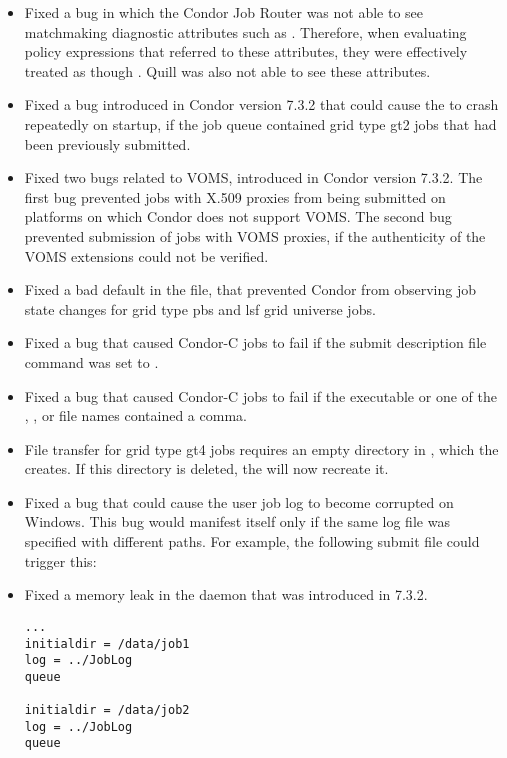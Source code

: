 \begin{itemize}
\item Fixed a bug in which the Condor Job Router was not able
to see matchmaking diagnostic attributes such as .
Therefore, when evaluating policy
expressions that referred to these attributes, they were effectively
treated as though .
Quill was also not able to see these attributes.

\item Fixed a bug introduced in Condor version 7.3.2 that could cause the
 to crash repeatedly on startup,
if the job queue
contained grid type gt2 jobs that had been previously submitted.

\item Fixed two bugs related to VOMS, introduced in Condor version 7.3.2.
The first bug
prevented jobs with X.509 proxies from being submitted on platforms
on which Condor does not support VOMS.
The second bug prevented submission
of jobs with VOMS proxies, if the authenticity of the VOMS extensions
could not be verified.

\item Fixed a bad default in the  file,
that prevented
Condor from observing job state changes for grid type pbs and lsf grid
universe jobs.

\item Fixed a bug that caused Condor-C jobs to fail if
the submit description file command 
was set to .

\item Fixed a bug that caused Condor-C jobs to fail if the executable
or one of the , , or  file names
contained a comma.

\item File transfer for grid type gt4 jobs requires an empty directory
in , which the  creates. If this directory
is deleted, the  will now recreate it.

\item Fixed a bug that could cause the user job log to become
  corrupted on Windows.  This bug would manifest itself only if the
  same log file was specified with different paths.  For example, the
  following submit file could trigger this:

\item Fixed a memory leak in the  daemon that was introduced
in 7.3.2.

\begin{verbatim}
...
initialdir = /data/job1
log = ../JobLog
queue

initialdir = /data/job2
log = ../JobLog
queue
\end{verbatim}

\end{itemize}

